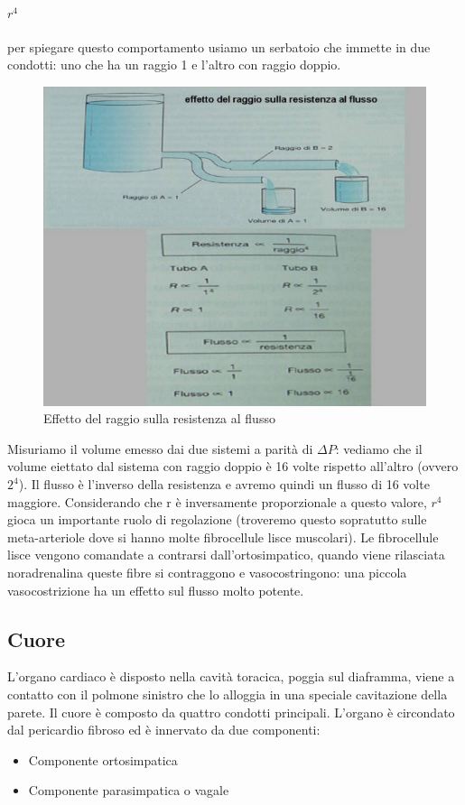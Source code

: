 \documentclass[a4paper,12pt]{article}
\begin{document}
\paragraph{$r^{4}$} per spiegare questo comportamento usiamo un serbatoio che immette in due condotti: uno che ha un raggio 1 e l'altro con raggio doppio. 
\begin{figure}[H]
\centering
\includegraphics[scale=0.4]{immagine/raggio.jpg}
\caption{Effetto del raggio sulla resistenza al flusso}
\end{figure}

Misuriamo il volume emesso dai due sistemi a parità di $\Delta P$: vediamo che il volume eiettato dal sistema con raggio doppio è 16 volte rispetto all'altro (ovvero $2^{4}$). Il flusso è l'inverso della resistenza e avremo quindi un flusso di 16 volte maggiore. Considerando che r è inversamente proporzionale a questo valore, $r^{4}$ gioca un importante ruolo di regolazione (troveremo questo sopratutto sulle meta-arteriole dove si hanno molte fibrocellule lisce muscolari). Le fibrocellule lisce vengono comandate a contrarsi dall'ortosimpatico, quando viene rilasciata noradrenalina queste fibre si contraggono e vasocostringono: una piccola vasocostrizione ha un effetto sul flusso molto potente.

\subsection{Cuore}
L'organo cardiaco è disposto nella cavità toracica, poggia sul diaframma, viene a contatto con il polmone sinistro che lo alloggia in una speciale cavitazione della parete. Il cuore è composto da quattro condotti principali. L'organo è circondato dal pericardio fibroso ed è innervato da due componenti:
\begin{itemize}
\item{Componente ortosimpatica}
\item{Componente parasimpatica o vagale}
\end{itemize}
\end{document}
